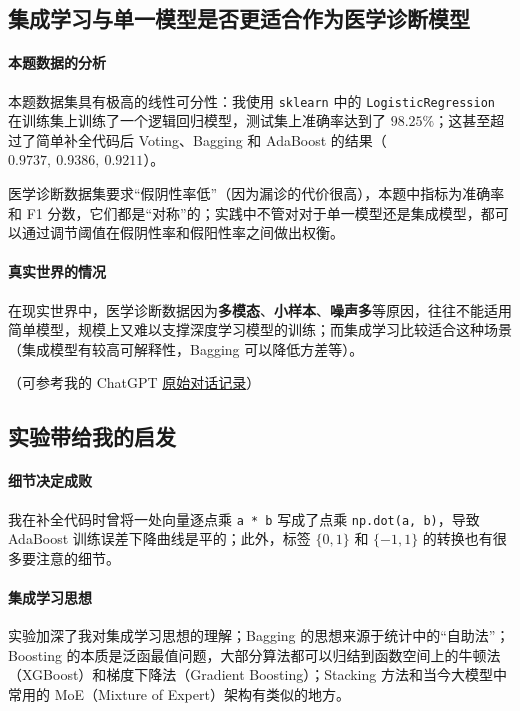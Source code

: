 \documentclass[oneside]{ctexbook}
\begin{document}
\subsection{集成学习与单一模型是否更适合作为医学诊断模型}

\paragraph{本题数据的分析}

本题数据集具有极高的线性可分性：我使用 \verb|sklearn| 中的 \verb|LogisticRegression| 在训练集上训练了一个逻辑回归模型，测试集上准确率达到了 $98.25\%$；这甚至超过了简单补全代码后 Voting、Bagging 和 AdaBoost 的结果（$0.9737,~0.9386,~0.9211$）。

医学诊断数据集要求“假阴性率低”（因为漏诊的代价很高），本题中指标为准确率和 F1 分数，它们都是“对称”的；实践中不管对对于单一模型还是集成模型，都可以通过调节阈值在假阴性率和假阳性率之间做出权衡。

\paragraph{真实世界的情况}

在现实世界中，医学诊断数据因为{\bf 多模态}、{\bf 小样本}、{\bf 噪声多}等原因，往往不能适用简单模型，规模上又难以支撑深度学习模型的训练；而集成学习比较适合这种场景（集成模型有较高可解释性，Bagging 可以降低方差等）。

（可参考我的 ChatGPT \href{https://chatgpt.com/share/69537e51-e91c-8001-9ad7-15b23e80a232}{原始对话记录}）

\subsection{实验带给我的启发}

\paragraph{细节决定成败} 我在补全代码时曾将一处向量逐点乘 \verb|a * b| 写成了点乘 \verb|np.dot(a, b)|，导致 AdaBoost 训练误差下降曲线是平的；此外，标签 $\{0,1\}$ 和 $\{-1,1\}$ 的转换也有很多要注意的细节。

\paragraph{集成学习思想} 实验加深了我对集成学习思想的理解；Bagging 的思想来源于统计中的“自助法”；Boosting 的本质是泛函最值问题，大部分算法都可以归结到函数空间上的牛顿法（XGBoost）和梯度下降法（Gradient Boosting）；Stacking 方法和当今大模型中常用的 MoE（Mixture of Expert）架构有类似的地方。
\end{document}
